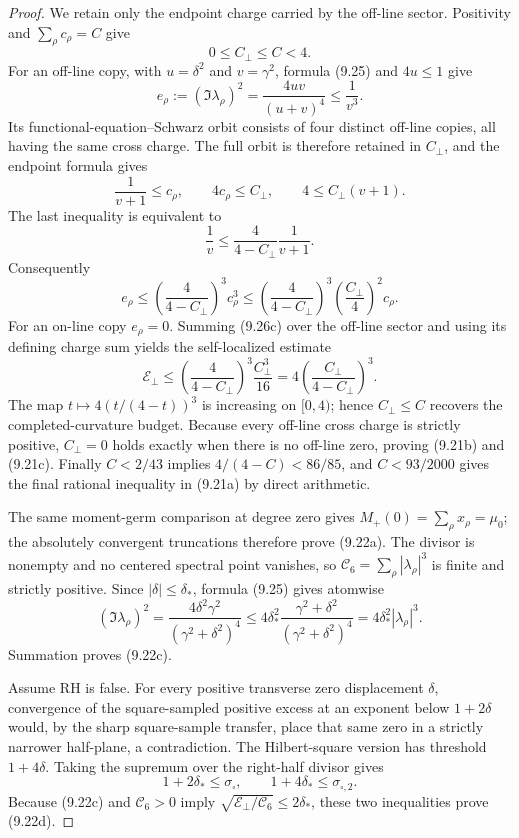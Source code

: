 \documentclass[11pt]{article}
\begin{document}
\begin{proof}
We retain only the endpoint charge carried by the off-line sector.  Positivity and
\(\sum_\rho c_\rho=C\) give
\[
 0\le C_\perp\le C<4.
\]
For an off-line copy, with $u=\delta^2$ and $v=\gamma^2$, formula \textup{(9.25)} and
$4u\le1$ give
\[
 e_\rho:=(\Im\lambda_\rho)^2
 =\frac{4uv}{(u+v)^4}\le\frac1{v^3}.
 \tag{9.26a}
\]
Its functional-equation--Schwarz orbit consists of four distinct off-line copies, all having
the same cross charge.  The full orbit is therefore retained in \(C_\perp\), and the endpoint
formula gives
\[
 \frac1{v+1}\le c_\rho,\qquad
 4c_\rho\le C_\perp,\qquad
 4\le C_\perp(v+1).
 \tag{9.26b}
\]
The last inequality is equivalent to
\[
 \frac1v\le\frac4{4-C_\perp}\frac1{v+1}.
\]
Consequently
\[
 e_\rho\le
 \left(\frac4{4-C_\perp}\right)^3c_\rho^3
 \le
 \left(\frac4{4-C_\perp}\right)^3
 \left(\frac {C_\perp}4\right)^2c_\rho.
 \tag{9.26c}
\]
For an on-line copy $e_\rho=0$.  Summing \textup{(9.26c)} over the off-line sector and using
its defining charge sum yields the self-localized estimate
\[
 \mathcal E_\perp\le
 \left(\frac4{4-C_\perp}\right)^3\frac{C_\perp^3}{16}
 =4\left(\frac{C_\perp}{4-C_\perp}\right)^3.
\]
The map \(t\mapsto4(t/(4-t))^3\) is increasing on \([0,4)\); hence
\(C_\perp\le C\) recovers the completed-curvature budget.  Because every off-line cross charge
is strictly positive, \(C_\perp=0\) holds exactly when there is no off-line zero, proving
\textup{(9.21b)} and \textup{(9.21c)}.  Finally $C<2/43$ implies
$4/(4-C)<86/85$, and $C<93/2000$ gives the final rational inequality in
\textup{(9.21a)} by direct arithmetic.

The same moment-germ comparison at degree zero gives
$M_+(0)=\sum_\rho x_\rho=\mu_0$; the absolutely convergent truncations therefore prove
\textup{(9.22a)}.  The divisor is nonempty and no centered spectral point vanishes, so
$\mathcal C_6=\sum_\rho|\lambda_\rho|^3$ is finite and strictly positive.  Since
$|\delta|\le\delta_*$, formula \textup{(9.25)} gives atomwise
\[
 (\Im\lambda_\rho)^2
 =\frac{4\delta^2\gamma^2}{(\gamma^2+\delta^2)^4}
 \le4\delta_*^2\frac{\gamma^2+\delta^2}{(\gamma^2+\delta^2)^4}
 =4\delta_*^2|\lambda_\rho|^3.
\]
Summation proves \textup{(9.22c)}.

Assume RH is false.  For every positive transverse zero displacement $\delta$, convergence of
the square-sampled positive excess at an exponent below $1+2\delta$ would, by the sharp
square-sample transfer, place that same zero in a strictly narrower half-plane, a contradiction.
The Hilbert-square version has threshold $1+4\delta$.  Taking the supremum over the right-half
divisor gives
\[
 1+2\delta_*\le\sigma_\square,
 \qquad 1+4\delta_*\le\sigma_{\square,2}.
\]
Because \textup{(9.22c)} and $\mathcal C_6>0$ imply
$\sqrt{\mathcal E_\perp/\mathcal C_6}\le2\delta_*$, these two inequalities prove
\textup{(9.22d)}.


\end{proof}
\end{document}
